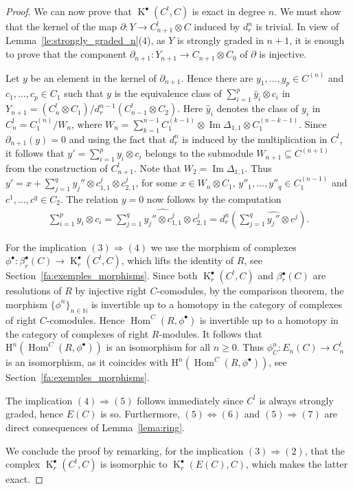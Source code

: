 \documentclass[11pt]{article}
\newcommand{\h}{\mathrm{H}}
\DeclareMathOperator{\im}{Im}
\DeclareMathOperator{\K}{K}
\newcommand\ot{\otimes}
\newcommand\rar{\rightarrow}
\renewcommand{\^}[1]{\mbox{$^{\left( #1 \right)}$}}
\renewcommand{\_}[1]{\mbox{$_{\left( #1 \right)}$}}
\newcommand{\N}{{\mathbb N}}
\newcommand\Hom{\operatorname{Hom}}
\newcommand{\pa}{\partial}
\numberwithin{equation}{section}
\begin{document}
\begin{proof}
We can now prove that $\K^\bullet(C^!,C)$ is exact in degree $n$. We must show that the kernel of the map $\pa\colon Y\to C^!_{n+1}\ot C$ induced by $d^n_r$ is trivial. In view of Lemma~\ref{le:strongly_graded_n}(4), as $Y$ is strongly graded in $n+1$, it is enough to prove that the component $\pa_{n+1}\colon Y_{n+1}\to C_{n+1}\ot C_0$ of $\pa$ is injective.

Let $y$ be an element in the kernel of $\pa_{n+1}$. Hence there are ${y}_1, \dots,{y}_p\in C^{(n)}$ and $c_1,\dots, c_p\in C_1$ such that $y$ is the equivalence class of $\sum\limits_{i=1}^p \widehat{y}_i\ot c_i$ in $Y_{n+1}=(C_n^!\ot C_1)/d_r^{n-1}(C_{n-1}^!\ot C_2)$. Here $\widehat{y}_i$ denotes the class of $y_i$ in $C^!_n=C_1^{(n)}/W_n$, where $W_n=\sum\limits_{k=1}^{n-1} C_1^{(k-1)}\ot\im\Delta_{1,1}\ot C_1^{(n-k-1)}$. Since $\pa_{n+1}(y)=0$ and using the fact that $d_r^n$ is induced by the multiplication in $C^!$, it follows that $y'=\sum\limits_{i=1}^p {y}_i\ot c_i$ belongs to the submodule $W_{n+1}\subseteq C^{(n+1)}$ from the construction of $C_{n+1}^!$. Note that $W_2=\im\Delta_{1,1}$. Thus $y'=x+\sum\limits_{j=1}^q y_j''\ot c^j_{1,1}\ot c^j_{2,1}$, for some $x\in W_n\ot C_1$, $y''_1,\dots,y''_q\in C_1^{(n-1)}$ and $c^1,\dots,c^q\in C_2$. The relation $y=0$ now follows by the computation
\begin{gather*}
 \sum_{i=1}^p \widehat{y}_i\ot c_i=\sum_{j=1}^q \widehat{y_j''\ot c^j_{1,1}}\ot c^j_{2,1}=d_r^{n}\left(\sum_{j=1}^q {\widehat{y_j''}\ot c^j}\right).
\end{gather*}

For the implication $(3) \Longrightarrow (4)$ we use the morphism of complexes $\phi^\bullet\colon \beta^\bullet_r(C) \rar \operatorname{K}_r^\bullet(C^!,C)$, which lifts the identity of $R$, see Section~\ref{fa:exemples_morphisms}. Since both $\K^{\bullet}_{r}(C^!,C)$ and $\beta{}^{\bullet}_{r}(C)$ are resolutions of $R$ by injective right $C$-comodules, by the comparison theorem, the morphism $\{\phi^n\}_{n\in\N}$ is invertible up to a homotopy in the category of complexes of right $C$-comodules. Hence $\Hom^C(R,\phi^\bullet)$ is invertible up to a homotopy in the category of complexes of right $R$-modules. It follows that $\h^n(\Hom^C(R,\phi^\bullet))$ is an isomorphism for all $n\geq 0$. Thus $\phi^n_C\colon E_n(C)\to C^!_n$ is an isomorphism, as it coincides with $\h^n(\Hom^C(R,\phi^\bullet))$, see Section~\ref{fa:exemples_morphisms}.

The implication $(4) \Longrightarrow (5)$ follows immediately since $C^!$ is always strongly graded, hence $E(C)$ is so. Furthermore, $(5) \iff (6)$ and $(5) \Longrightarrow (7)$ are direct consequences of Lemma~\ref{lema:ring}.

We conclude the proof by remarking, for the implication $(3) \Longrightarrow (2)$, that the complex $\K^\bullet_r(C^!,C)$ is isomorphic to $\K^\bullet_r(E(C),C)$, which makes the latter exact.
\end{proof}
\end{document}
